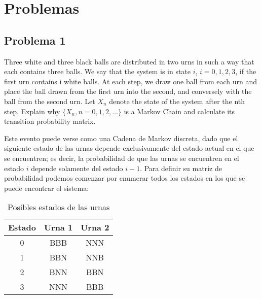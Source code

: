 \documentclass{article}
\begin{document}
    \section{Problemas}

        \subsection*{Problema 1}

            Three white and three black balls are distributed in two urns in such a way that each contains three balls. We say that the system is in state $i$, $i = 0, 1, 2, 3$, if the first urn contains i white balls. At each step, we draw one ball from each urn and place the ball drawn from the first urn into the second, and conversely with the ball from the second urn. Let $X_n$ denote the state of the system after the nth step. Explain why $\{X_n,n = 0, 1, 2,...\}$ is a Markov Chain and calculate its transition probability matrix.

            Este evento puede verse como una Cadena de Markov discreta, dado que el siguiente estado de las urnas depende exclusivamente del estado actual en el que se encuentren; es decir, la probabilidad de que las urnas se encuentren en el estado $i$ depende solamente del estado $i-1$. Para definir su matriz de probabilidad podemos comenzar por enumerar todos los estados en los que se puede encontrar el sistema:

            \begin{table}[!htbp]
                \centering
                \begin{tabular}{ |c|cc| }
                    \hline
                    Estado & Urna 1 & Urna 2 \\
                    \hline
                    0 & BBB & NNN \\
                    1 & BBN & NNB \\
                    2 & BNN & BBN \\
                    3 & NNN & BBB \\
                    \hline
                \end{tabular}
                \caption{Posibles estados de las urnas}
                \label{table:urns}
            \end{table}
\end{document}
